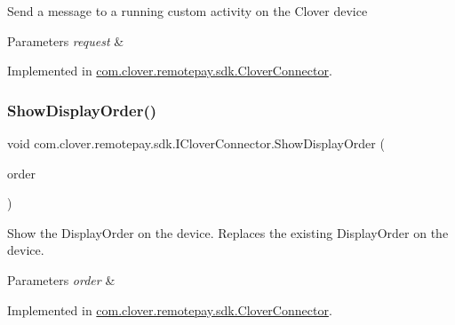 Send a message to a running custom activity on the Clover device 


\begin{DoxyParams}{Parameters}
{\em request} & \\
\hline
\end{DoxyParams}


Implemented in \hyperlink{classcom_1_1clover_1_1remotepay_1_1sdk_1_1_clover_connector_a328a0dd8b4ed02567f7e8d3184f35038}{com.\+clover.\+remotepay.\+sdk.\+Clover\+Connector}.

\mbox{\label{interfacecom_1_1clover_1_1remotepay_1_1sdk_1_1_i_clover_connector_a50be4c513f6f67971b51f6f76f30ac06}} 
\subsubsection{\texorpdfstring{Show\+Display\+Order()}{ShowDisplayOrder()}}
{\footnotesize\ttfamily void com.\+clover.\+remotepay.\+sdk.\+I\+Clover\+Connector.\+Show\+Display\+Order (\begin{DoxyParamCaption}\item[{\hyperlink{classcom_1_1clover_1_1remote_1_1order_1_1_display_order}{Display\+Order}}]{order }\end{DoxyParamCaption})}



Show the Display\+Order on the device. Replaces the existing Display\+Order on the device. 


\begin{DoxyParams}{Parameters}
{\em order} & \\
\hline
\end{DoxyParams}


Implemented in \hyperlink{classcom_1_1clover_1_1remotepay_1_1sdk_1_1_clover_connector_abfa384bfc0c016908d137e0332b7e06c}{com.\+clover.\+remotepay.\+sdk.\+Clover\+Connector}.

\mbox{\label{interfacecom_1_1clover_1_1remotepay_1_1sdk_1_1_i_clover_connector_a2d4c2a87f772459bb1a494e2f87835a8}} 
